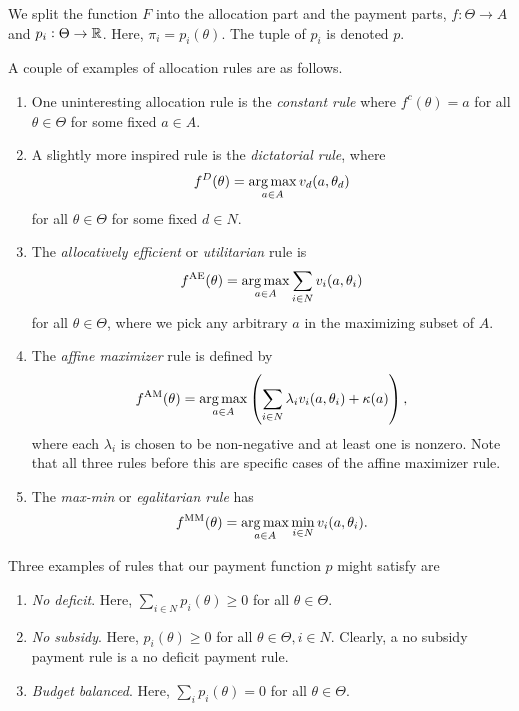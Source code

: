 		We split the function $F$ into the allocation part and the payment parts, $f : \Theta \to A$ and $p_i : \Theta \to \mathbb{R}$. Here, $\pi_i = p_i(\theta)$. The tuple of $p_i$ is denoted $p$.

		\begin{fex}
			\label{ex: payment alloc rules}
			A couple of examples of allocation rules are as follows.
			\begin{enumerate}
				\item One uninteresting allocation rule is the \emph{constant rule} where $f^c(\theta) = a$ for all $\theta \in \Theta$ for some fixed $a \in A$.

				\item A slightly more inspired rule is the \emph{dictatorial rule}, where
				\[ f^D(\theta) = \operatorname*{arg\,max}_{a \in A} v_d(a,\theta_d) \]
				for all $\theta \in \Theta$ for some fixed $d \in N$.
				
				\item The \emph{allocatively efficient} or \emph{utilitarian} rule is
				\[ f^{\text{AE}}(\theta) = \operatorname*{arg\,max}_{a \in A} \sum_{i \in N} v_i(a,\theta_i) \]
				for all $\theta \in \Theta$, where we pick any arbitrary $a$ in the maximizing subset of $A$.

				\item The \emph{affine maximizer} rule is defined by
				\[ f^{\text{AM}}(\theta) = \operatorname*{arg\,max}_{a \in A} \left( \sum_{i \in N} \lambda_i v_i(a,\theta_i) + \kappa(a) \right), \]
				where each $\lambda_i$ is chosen to be non-negative and at least one is nonzero. Note that all three rules before this are specific cases of the affine maximizer rule.

				\item The \emph{max-min} or \emph{egalitarian rule} has
				\[ f^\text{MM}(\theta) = \operatorname*{arg\,max}_{a \in A} \min_{i \in N} v_i(a,\theta_i). \]
			\end{enumerate}
		\end{fex}

		\begin{fex}
			Three examples of rules that our payment function $p$ might satisfy are
			\begin{enumerate}
				\item \emph{No deficit}. Here, $\sum_{i \in N} p_i(\theta) \ge 0$ for all $\theta \in \Theta$.
				\item \emph{No subsidy}. Here, $p_i(\theta) \ge 0$ for all $\theta \in \Theta, i \in N$. Clearly, a no subsidy payment rule is a no deficit payment rule.
				\item \emph{Budget balanced}. Here, $\sum_i p_i(\theta) = 0$ for all $\theta \in \Theta$. 
			\end{enumerate}
		\end{fex}

